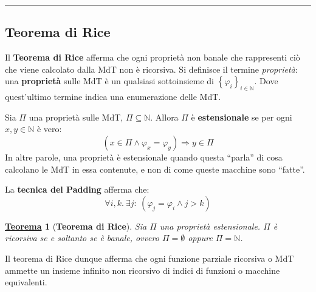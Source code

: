 \documentclass[a4paper]{article}
\newtheorem{theorem}{\textcolor{Red3}{\underline{Teorema}}}
\newcommand{\dquotes}[1]{``#1''}
\newcommand{\longline}{\noindent\rule{\textwidth}{0.4pt}}
\begin{document}
	\longline

	\subsection{Teorema di Rice}
	
	Il \textcolor{Red3}{\textbf{Teorema di Rice}} afferma che ogni proprietà non banale che rappresenti ciò che viene calcolato dalla MdT non è ricorsiva. Si definisce il termine \emph{proprietà}: una \textcolor{Red3}{\textbf{proprietà}} sulle MdT è un qualsiasi sottoinsieme di $\left\{\varphi_{i}\right\}_{i \in \mathbb{N}}$. Dove quest'ultimo termine indica una enumerazione delle MdT.\newline
	
	\noindent
	Sia $\Pi$ una proprietà sulle MdT, $\Pi\subseteq\mathbb{N}$. Allora $\Pi$ è \textcolor{Red3}{\textbf{estensionale}} se per ogni $x, y \in \mathbb{N}$ è vero:
	\begin{equation*}
		\left(x \in \Pi \land \varphi_{x} = \varphi_{y}\right) \Longrightarrow y \in \Pi
	\end{equation*}
	In altre parole, una proprietà è estensionale quando questa \dquotes{parla} di cosa calcolano le MdT in essa contenute, e non di come queste macchine sono \dquotes{fatte}.\newline
	
	\noindent
	La \textbf{tecnica del Padding} afferma che:
	\begin{equation*}
		\forall i, k. \: \exists j: \:\left(\varphi_{j} = \varphi_{i} \land j > k\right)
	\end{equation*}
	\begin{theorem}[\textbf{Teorema di Rice}]
		Sia $\Pi$ una proprietà estensionale. $\Pi$ è ricorsiva se e soltanto se è banale, ovvero $\Pi = \emptyset$ oppure $\Pi = \mathbb{N}$.
	\end{theorem}
	\noindent
	Il teorema di Rice dunque afferma che ogni funzione parziale ricorsiva o MdT ammette un insieme infinito non ricorsivo di indici di funzioni o macchine equivalenti.
\end{document}
